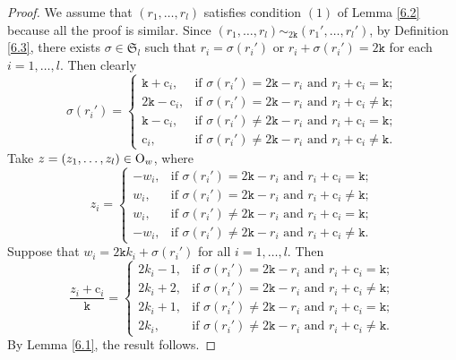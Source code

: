 \documentclass[11pt]{amsart}
\theoremstyle{plain}
\numberwithin{equation}{subsection}
\begin{document}
\begin{proof}
We assume that $(r_1, \dots, r_l)$ satisfies condition $(1)$ of Lemma \ref{6.2} because all the proof is similar.
Since $(r_1, \dots, r_l)\sim_{2\mathtt{k}}(r_1', \dots, r_l')$, by Definition \ref{6.3}, there exists $\sigma\in \mathfrak{S}_l$ such that 
$r_i=\sigma(r_i')$ or $r_i+\sigma(r_i')=2\mathtt{k}$ for each $i=1, \dots, l$. 
Then clearly 
$$\sigma(r_i')=\begin{cases}
	\mathtt{k}+\mathrm{c}_i, & \mbox{if }  \sigma(r_i')= 2\mathtt{k}-r_i\,\, \text{and} \,\,r_i+\mathrm{c}_i=\mathtt{k}; \\
	2\mathtt{k}-\mathrm{c}_i, & \mbox{if } \sigma(r_i')= 2\mathtt{k}-r_i\,\, \text{and} \,\,r_i+\mathrm{c}_i \neq\mathtt{k};\\
	\mathtt{k}-\mathrm{c}_i, & \mbox{if } \sigma(r_i')\neq 2\mathtt{k}-r_i \,\, \text{and}\,\,r_i+\mathrm{c}_i=\mathtt{k}; \\
     \mathrm{c}_i, & \mbox{if } \sigma(r_i') \neq 2\mathtt{k}-r_i\,\, \text{and} \,\,r_i+\mathrm{c}_i \neq \mathtt{k}.
\end{cases}$$
Take $z=(z_1, \dots, z_l)\in {\rm O}_w$, where
$$z_i=\begin{cases}
	-w_i, & \mbox{if }  \sigma(r_i')= 2\mathtt{k}-r_i\,\, \text{and} \,\,r_i+\mathrm{c}_i=\mathtt{k}; \\
	w_i, & \mbox{if } \sigma(r_i')= 2\mathtt{k}-r_i\,\, \text{and} \,\,r_i+\mathrm{c}_i \neq\mathtt{k};\\
	w_i, & \mbox{if } \sigma(r_i')\neq 2\mathtt{k}-r_i \,\, \text{and}\,\,r_i+\mathrm{c}_i=\mathtt{k}; \\
    -w_i, & \mbox{if } \sigma(r_i') \neq 2\mathtt{k}-r_i\,\, \text{and} \,\,r_i+\mathrm{c}_i \neq \mathtt{k}.
\end{cases}$$
Suppose that $w_i=2\mathtt{k}k_i+\sigma(r_i')$ for all $i=1, \dots, l$.
Then
$$\frac{z_i+\mathrm{c}_i}{\mathtt{k}}=\begin{cases}
	2k_i-1, & \mbox{if }  \sigma(r_i')= 2\mathtt{k}-r_i\,\, \text{and} \,\,r_i+\mathrm{c}_i=\mathtt{k}; \\
	2k_i+2, & \mbox{if } \sigma(r_i')=2\mathtt{k}-r_i\,\, \text{and} \,\,r_i+\mathrm{c}_i \neq\mathtt{k};\\
	2k_i+1, & \mbox{if } \sigma(r_i')\neq 2\mathtt{k}-r_i \,\, \text{and}\,\,r_i+\mathrm{c}_i=\mathtt{k}; \\
	2k_i, & \mbox{if } \sigma(r_i') \neq 2\mathtt{k}-r_i\,\, \text{and} \,\,r_i+\mathrm{c}_i \neq \mathtt{k}.
\end{cases}$$ 
By Lemma \ref{6.1}, the result follows.
\end{proof}
\end{document}
